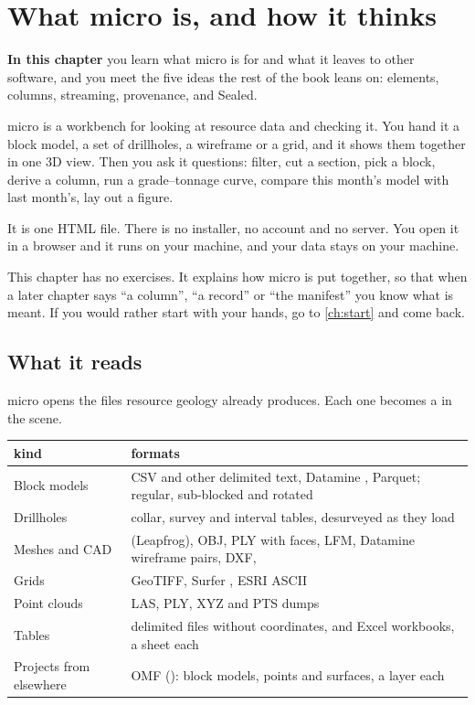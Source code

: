 \chapter{What micro is, and how it thinks}\label{ch:micro}
\begin{goals}
\textbf{In this chapter} you learn what micro is for and what it leaves to other software, and you meet the five ideas the rest of the book leans on: elements, columns, streaming, provenance, and Sealed.
\end{goals}

micro is a workbench for looking at resource data and checking it. You hand it a block model, a set of drillholes, a wireframe or a grid, and it shows them together in one 3D view. Then you ask it questions: filter, cut a section, pick a block, derive a column, run a grade–tonnage curve, compare this month's model with last month's, lay out a figure.

It is one HTML file. There is no installer, no account and no server. You open it in a browser and it runs on your machine, and your data stays on your machine.

This chapter has no exercises. It explains how micro is put together, so that when a later chapter says ``a column'', ``a record'' or ``the manifest'' you know what is meant. If you would rather start with your hands, go to \cref{ch:start} and come back.

\section{What it reads}\label{sec:micro-reads}
micro opens the files resource geology already produces. Each one becomes a  in the scene.

\begin{tabularx}{\linewidth}{@{}lL@{}}\toprule
kind & formats \\ \midrule
Block models & CSV and other delimited text, Datamine , Parquet; regular, sub-blocked and rotated \\
Drillholes & collar, survey and interval tables, desurveyed as they load \\
Meshes and CAD &  (Leapfrog), OBJ, PLY with faces, LFM, Datamine wireframe pairs, DXF,  \\
Grids & GeoTIFF, Surfer , ESRI ASCII  \\
Point clouds & LAS, PLY, XYZ and PTS dumps \\
Tables & delimited files without coordinates, and Excel workbooks, a sheet each \\
Projects from elsewhere & OMF (): block models, points and surfaces, a layer each \\
\bottomrule
\end{tabularx}


